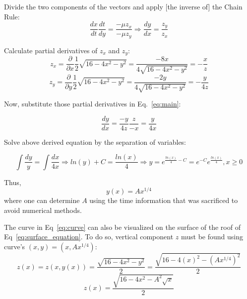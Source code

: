 \documentclass{article}
\begin{document}
Divide the two components of the vectors and apply [the inverse of] the Chain Rule:
\begin{equation} \label{eq:main}
  \frac{dx}{dt} \frac{dt}{dy} = \frac{-\mu z_x}{-\mu z_y} \Rightarrow \frac{dy}{dx} = \frac{z_y}{z_x}
\end{equation}

Calculate partial derivatives of $z_x$ and $z_y$:
\begin{equation*}
  z_x = \frac{\partial}{\partial x}{ \frac{1}{2}\sqrt{16 - 4x^2 - y^2}} = \frac{-8x}{4 \sqrt{16-4x^2-y^2}} = -\frac{x}{z}
\end{equation*}
\begin{equation*}
  z_y = \frac{\partial}{\partial y}{ \frac{1}{2}\sqrt{16 - 4x^2 - y^2}} = \frac{-2y}{4 \sqrt{16-4x^2-y^2}} = -\frac{y}{4z}
\end{equation*}

Now, substitute those partial derivatives in Eq.~\eqref{eq:main}:

\begin{equation*}
  \frac{dy}{dx} = \frac{-y}{4z} \frac{z}{-x} = \frac{y}{4x}
\end{equation*}

Solve above derived equation by the separation of variables:

\begin{equation*}
  \int{\frac{dy}{y}} = \int{\frac{dx}{4x}} \Rightarrow ln(y) + C = \frac{ln(x)}{4} \Rightarrow y = e^{\frac{ln(x)}{4} - C} = e^{-C}e^{\frac{ln(x)}{4}}, x \ge 0
\end{equation*}

Thus,
\begin{equation} \label{eq:curve}
  y(x) = Ax^{1/4}
\end{equation}
where one can determine $A$  using the time information that was sacrificed to avoid numerical methods.

The curve in Eq~\eqref{eq:curve} can also be visualized on the surface of the roof of Eq~\eqref{eq:surface_equation}. To do so, vertical component $z$ must be found using curve's $(x, y) = (x, Ax^{1/4})$:
\begin{equation*}
  z(x) = z(x, y(x)) = \frac{\sqrt{16 - 4x^2 - y^2}}{2} = \frac{\sqrt{16 - 4(x)^2 - (Ax^{1/4})^2}}{2}
\end{equation*}
\begin{equation} \label{eq:raindrop_path_z}
  z(x) = \frac{\sqrt{16 - 4x^2 - A^2\sqrt{x}}}{2}
\end{equation}
\end{document}
